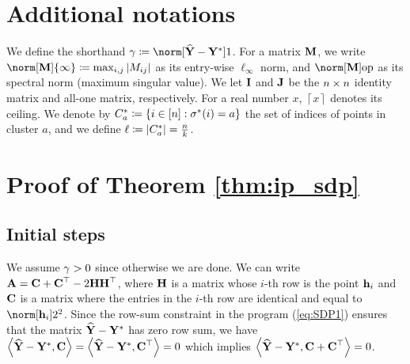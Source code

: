 



\appendix

\section{Additional notations}

We define the shorthand $\error\coloneqq\norm[\Yhat-\Ystar]1$. For
a matrix $\mathbf{M}$, we write $\norm[\M]{\infty}\coloneqq\max_{i,j}\left|M_{ij}\right|$
as its entry-wise $\ell_{\infty}$ norm, and $\opnorm{\M}$ as its
spectral norm (maximum singular value).  We let $\mathbf{I}$ and $\mathbf{J}$
be the $n\times n$ identity matrix and all-one matrix, respectively.
For a real number $x$, $\left\lceil x\right\rceil $ denotes its
ceiling. We denote by $C_{a}^{*}\coloneqq\left\{ i\in\left[n\right]:\sigma^{*}(i)=a\right\} $
the set of indices of points in cluster $a$, and we define $\ell\coloneqq\left|C_{a}^{*}\right|=\frac{n}{k}$. 

\section{Proof of Theorem \ref{thm:ip_sdp}\label{sec:proof_ip_sdp}}

\subsection{Initial steps}

We assume $\gamma>0$ since otherwise we are done. We can write $\mathbf{A}=\mathbf{C}+\mathbf{C}{\displaystyle ^{\top}}-2\mathbf{H}\mathbf{H}{\displaystyle ^{\top}}$,
where $\mathbf{H}$ is a matrix whose $i$-th row is the point $\mathbf{h}_{i}$ and
$\mathbf{C}$ is a matrix where the entries in the $i$-th row are identical
and equal to $\norm[\h_{i}]2^{2}$. Since the row-sum constraint in
the program (\ref{eq:SDP1}) ensures that the matrix $\widehat{\mathbf{Y}}-\mathbf{Y}^{*}$
has zero row sum, we have $\left\langle \widehat{\mathbf{Y}}-\mathbf{Y}^{*},\mathbf{C}\right\rangle =\left\langle \widehat{\mathbf{Y}}-\mathbf{Y}^{*},\mathbf{C}{\displaystyle ^{\top}}\right\rangle =0$
which implies $\left\langle \widehat{\mathbf{Y}}-\mathbf{Y}^{*},\mathbf{C}+\mathbf{C}{\displaystyle ^{\top}}\right\rangle =0$.


